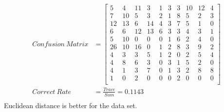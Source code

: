 \documentclass[11pt]{scrartcl}
\begin{document}
\begin{equation*}
\begin{aligned}
Confusion\ Matrix&=
\begin{bmatrix}
5 &  4 & 11 &  3 &  1 &  3 &  3 & 10 & 12 &  4\\
 7 & 10 &  5 &  3 &  2 &  1 &  8 &  5 &  2 &  3\\
12 & 13 &  6 & 14 &  4 &  3 &  7 &  5 &  1 &  0\\
 6 &  6 & 12 & 13 &  6 &  3 &  3 &  4 &  3 &  1\\
 5 & 10 &  0 &  0 &  0 &  1 &  6 &  2 &  4 &  0\\
26 & 10 & 16 &  0 &  1 &  2 &  8 &  3 &  9 &  2\\
 4 &  3 &  3 &  5 &  1 &  2 &  0 &  2 &  5 &  4\\
 4 &  8 &  6 &  3 &  0 &  3 &  1 &  5 &  2 &  0\\
 4 &  1 &  3 &  7 &  0 &  1 &  3 &  2 &  8 &  8\\
 1 &  0 &  2 &  0 &  0 &  0 &  2 &  0 &  0 &  0\\
\end{bmatrix}\\
Correct\ Rate&=\frac{Trace}{Sum}=0.1143\\
\end{aligned}
\end{equation*}
Euclidean distance is better for the data set.\\
\end{document}
